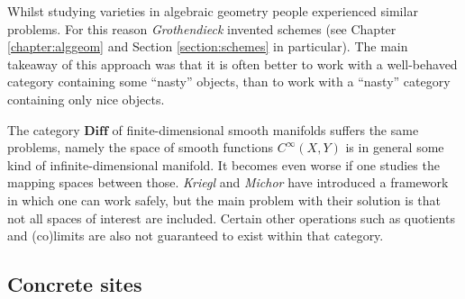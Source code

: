     Whilst studying varieties in algebraic geometry people experienced similar problems. For this reason \textit{Grothendieck} invented schemes (see Chapter \ref{chapter:alggeom} and Section \ref{section:schemes} in particular). The main takeaway of this approach was that it is often better to work with a well-behaved category containing some ``nasty'' objects, than to work with a ``nasty'' category containing only nice objects.

    The category $\mathbf{Diff}$ of finite-dimensional smooth manifolds suffers the same problems, namely the space of smooth functions $C^\infty(X,Y)$ is in general some kind of infinite-dimensional manifold. It becomes even worse if one studies the mapping spaces between those. \textit{Kriegl} and \textit{Michor} have introduced a framework in which one can work safely, but the main problem with their solution is that not all spaces of interest are included. Certain other operations such as quotients and (co)limits are also not guaranteed to exist within that category.

\subsection{Concrete sites}


